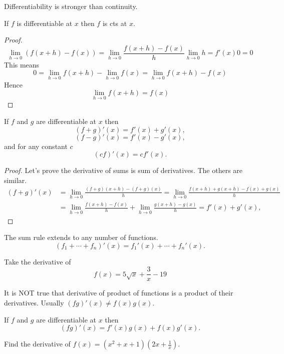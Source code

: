 \documentclass[../main.tex]{subfiles}
\begin{document}
  Differentiability is stronger than continuity.
  \begin{theorem}
    If $f$ is differentiable at $x$ then $f$ is cts at $x$.
  \end{theorem}

  \begin{proof}
    \[
      \lim_{h \to 0} (f(x+h) - f(x)) =
      \lim_{h \to 0} \dfrac{f(x+h) - f(x)}{h}
      \lim_{h \to 0} h = f'(x) 0 = 0
    \]
    This means
    \[
      0 =
      \lim_{h \to 0} f(x+h) - \lim_{h \to 0} f(x) =
      \lim_{h \to 0} f(x+h) - f(x)
    \]
    Hence
    \[
      \lim_{h \to 0} f(x+h) = f(x)
    \]
  \end{proof}

  \begin{theorem}
    If $f$ and $g$ are differentiable at $x$ then
    \[
      (f+g)'(x) = f'(x) + g'(x),
    \]
    \[
      (f-g)'(x) = f'(x) - g'(x),
    \]
    and for any constant $c$
    \[
      (c f)'(x) = c f'(x).
    \]
  \end{theorem}
  \begin{proof}
    Let's prove the derivative of sums is sum of derivatives. The others are similar.
    \[
      \begin{split}
        (f+g)'(x) &=
        \lim_{h \to 0} \frac{(f+g)(x+h) - (f+g)(x)}{h} =
        \lim_{h \to 0} \frac{f(x+h)+g(x+h) - f(x)+g(x)}{h} \\
        & = \lim_{h \to 0} \frac{f(x+h)-f(x)}{h} +
        \lim_{h \to 0} \frac{g(x+h)-g(x)}{h} =
        f'(x) + g'(x),
      \end{split}
    \]
  \end{proof}

  The sum rule extends to any number of functions.
  \[
    (f_1 + \cdots + f_n)'(x) = f_1'(x) + \cdots + f_n'(x).
  \]

  \begin{example}
    Take the derivative of
    \[
      f(x) = 5 \sqrt{x} + \frac{3}{x} - 19
    \]
  \end{example}

  It is NOT true that derivative of product of functions is a product of their derivatives. Usually $(fg)'(x) \neq f(x) g(x)$.

  \begin{theorem}
    If $f$ and $g$ are differentiable at $x$ then
    \[
      (f g)'(x) = f'(x) g(x) + f(x) g'(x).
    \]
  \end{theorem}

  \begin{example}
    Find the derivative of $f(x) = (x^2+x+1)(2x + \frac{1}{x})$.
  \end{example}
\end{document}
